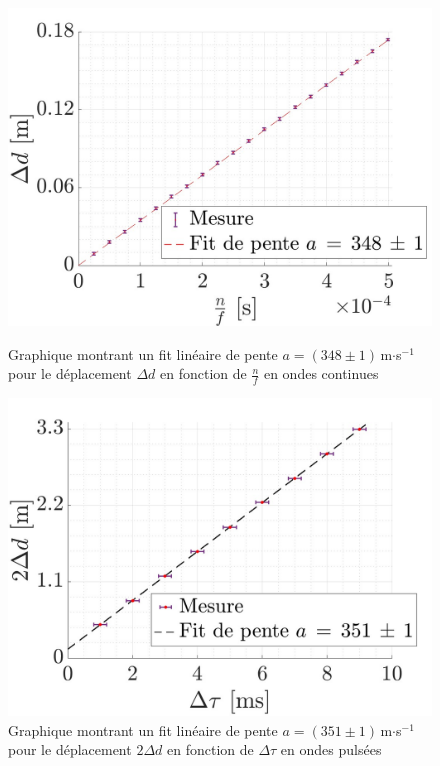 \documentclass[a4paper, 12pt,oneside]{article}
\begin{document}
\begin{figure}[H]
    \centering
    \begin{minipage}{0.45\textwidth}
        \centering
        \includegraphics[width=\linewidth]{Graphes_TP_F7/grph2.jpg}
        \captionsetup{justification=centering}
        \caption{Graphique montrant un fit linéaire de pente $a=(348\pm1)$\,m$\cdot$s$^{-1}$ pour le déplacement $\Delta d$ en fonction de $\frac{n}{f}$ en ondes continues}
        \label{fig2}
    \end{minipage}
    \hfill
    \begin{minipage}{0.45\textwidth}
        \centering
        \includegraphics[width=\linewidth]{Graphes_TP_F7/grph3.jpg}
        \captionsetup{justification=centering}
        \caption{Graphique montrant un fit linéaire de pente $a=(351\pm1)$\,m$\cdot$s$^{-1}$ pour le déplacement $2\Delta d$ en fonction de $\Delta \tau$ en ondes pulsées}
        \label{fig3}
    \end{minipage}
\end{figure}
\vspace{-0.8cm}
\end{document}
